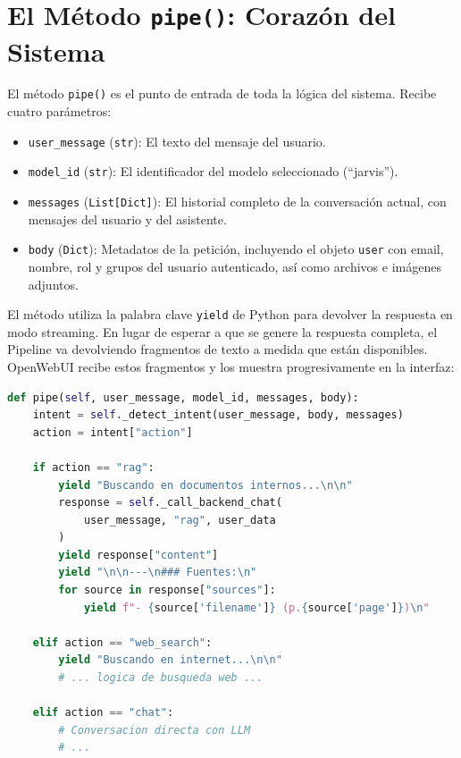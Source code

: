 \section{El Método \texttt{pipe()}: Corazón del Sistema}
\label{anexo:metodo-pipe}

El método \texttt{pipe()} es el punto de entrada de toda la lógica del sistema. Recibe cuatro parámetros:

\begin{itemize}
    \item \texttt{user\_message} (\texttt{str}): El texto del mensaje del usuario.
    \item \texttt{model\_id} (\texttt{str}): El identificador del modelo seleccionado (``jarvis'').
    \item \texttt{messages} (\texttt{List[Dict]}): El historial completo de la conversación actual, con mensajes del usuario y del asistente.
    \item \texttt{body} (\texttt{Dict}): Metadatos de la petición, incluyendo el objeto \texttt{user} con email, nombre, rol y grupos del usuario autenticado, así como archivos e imágenes adjuntos.
\end{itemize}

El método utiliza la palabra clave \texttt{yield} de Python para devolver la respuesta en modo streaming. En lugar de esperar a que se genere la respuesta completa, el Pipeline va devolviendo fragmentos de texto a medida que están disponibles. OpenWebUI recibe estos fragmentos y los muestra progresivamente en la interfaz:

\begin{lstlisting}[language=Python, caption={Ejemplo de respuesta streaming en el Pipeline.}]
def pipe(self, user_message, model_id, messages, body):
    intent = self._detect_intent(user_message, body, messages)
    action = intent["action"]

    if action == "rag":
        yield "Buscando en documentos internos...\n\n"
        response = self._call_backend_chat(
            user_message, "rag", user_data
        )
        yield response["content"]
        yield "\n\n---\n### Fuentes:\n"
        for source in response["sources"]:
            yield f"- {source['filename']} (p.{source['page']})\n"

    elif action == "web_search":
        yield "Buscando en internet...\n\n"
        # ... logica de busqueda web ...

    elif action == "chat":
        # Conversacion directa con LLM
        # ...
\end{lstlisting}

